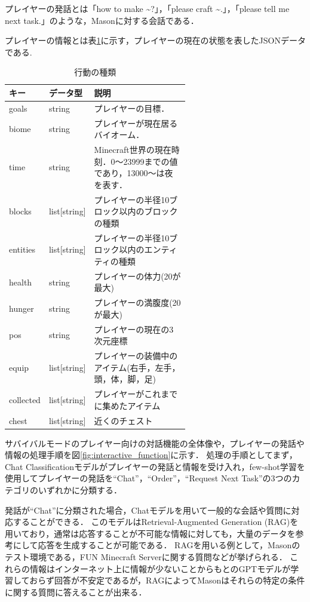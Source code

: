 プレイヤーの発話とは「how to make \textasciitilde?」，「please craft \textasciitilde.」，「please tell me next task.」のような，Masonに対する会話である．

プレイヤーの情報とは表\ref{tab:player_data}に示す，プレイヤーの現在の状態を表したJSONデータである.
\begin{table}[H]
    \caption{行動の種類}\label{tab:player_data}
    \centering
    \begin{tabular}{llp{0.6\linewidth}}
        \hline \hline
        キー & データ型 & 説明 \\
        \hline
        goals & string & プレイヤーの目標． \\
        biome & string & プレイヤーが現在居るバイオーム． \\
        time & string & Minecraft世界の現在時刻．0～23999までの値であり，13000～は夜を表す． \\
        blocks & list[string] & プレイヤーの半径10ブロック以内のブロックの種類 \\
        entities & list[string] & プレイヤーの半径10ブロック以内のエンティティの種類 \\
        health & string & プレイヤーの体力(20が最大) \\
        hunger & string & プレイヤーの満腹度(20が最大) \\
        pos & string & プレイヤーの現在の3次元座標 \\
        equip & list[string] & プレイヤーの装備中のアイテム(右手，左手，頭，体，脚，足) \\
        collected & list[string] & プレイヤーがこれまでに集めたアイテム \\
        chest & list[string] & 近くのチェスト \\
        \hline
    \end{tabular}
\end{table}

サバイバルモードのプレイヤー向けの対話機能の全体像や，プレイヤーの発話や情報の処理手順を図\ref{fig:interactive_function}に示す．
処理の手順としてまず，Chat Classificationモデルがプレイヤーの発話と情報を受け入れ，few-shot学習\cite{bib:few-shot}を使用してプレイヤーの発話を``Chat''，``Order''，``Request Next Task''の3つのカテゴリのいずれかに分類する．

発話が``Chat''に分類された場合，Chatモデルを用いて一般的な会話や質問に対応することができる．
このモデルはRetrieval-Augmented Generation (RAG)\cite{bib:rag}を用いており，通常は応答することが不可能な情報に対しても，大量のデータを参考にして応答を生成することが可能である．
RAGを用いる例として，Masonのテスト環境である，FUN Minecraft Server\cite{bib:fun_minecraft_server}に関する質問などが挙げられる．
これらの情報はインターネット上に情報が少ないことからもとのGPTモデルが学習しておらず回答が不安定であるが，RAGによってMasonはそれらの特定の条件に関する質問に答えることが出来る．

